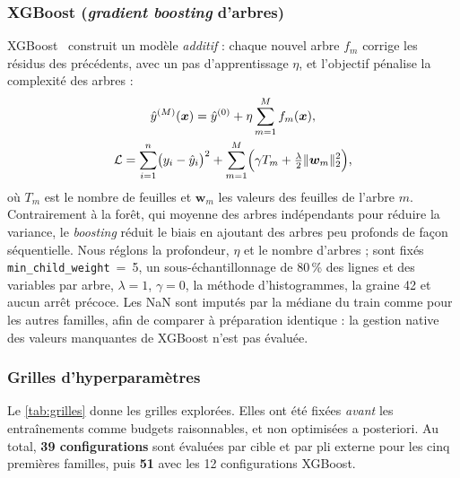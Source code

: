 \subsubsection{XGBoost (\emph{gradient boosting} d'arbres)}
XGBoost~\cite{chen_guestrin_2016} construit un modèle \emph{additif} : chaque
nouvel arbre $f_m$ corrige les résidus des précédents, avec un pas d'apprentissage
$\eta$, et l'objectif pénalise la complexité des arbres :
\begin{gather}
  \hat{y}^{(M)}(\bm{x}) = \hat{y}^{(0)} + \eta \sum_{m=1}^{M} f_m(\bm{x}), \\
  \mathcal{L} = \sum_{i=1}^{n} \bigl(y_i - \hat{y}_i\bigr)^2 + \sum_{m=1}^{M}\Bigl(\gamma T_m + \tfrac{\lambda}{2}\lVert \bm{w}_m\rVert_2^2\Bigr),
\end{gather}
où $T_m$ est le nombre de feuilles et $\bm{w}_m$ les valeurs des feuilles de
l'arbre $m$. Contrairement à la forêt, qui moyenne des arbres indépendants pour
réduire la variance, le \emph{boosting} réduit le biais en ajoutant des arbres
peu profonds de façon séquentielle. Nous réglons la profondeur, $\eta$ et le
nombre d'arbres ; sont fixés \texttt{min\_child\_weight}~=~5, un
sous-échantillonnage de 80\,\% des lignes et des variables par arbre,
$\lambda = 1$, $\gamma = 0$, la méthode d'histogrammes, la graine 42 et aucun
arrêt précoce. Les NaN sont imputés par la médiane du train comme pour les autres
familles, afin de comparer à préparation identique : la gestion native des
valeurs manquantes de XGBoost n'est pas évaluée.

\subsubsection{Grilles d'hyperparamètres}

Le \cref{tab:grilles} donne les grilles explorées. Elles ont été fixées
\emph{avant} les entraînements comme budgets raisonnables, et non optimisées a
posteriori. Au total, \textbf{39 configurations} sont évaluées par cible et par
pli externe pour les cinq premières familles, puis \textbf{51} avec les 12
configurations XGBoost.

